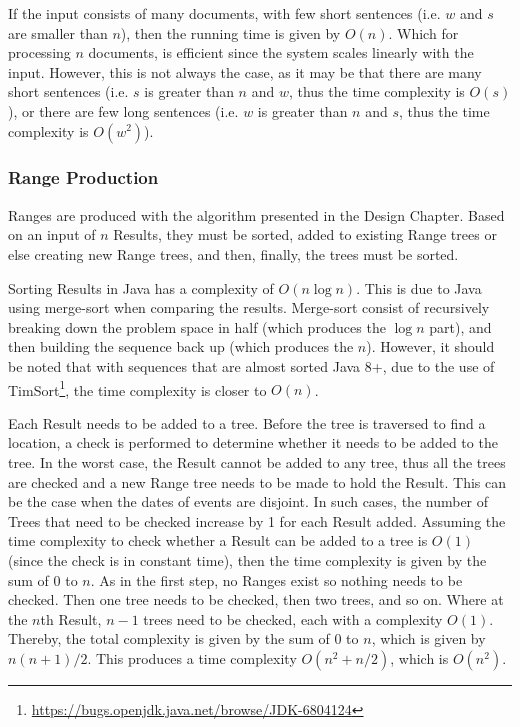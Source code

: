 \par If the input consists of many documents, with few short sentences (i.e. $w$ and $s$ are smaller than $n$), then the running time is given by $O(n)$. Which for processing $n$ documents, is efficient since the system scales linearly with the input. However, this is not always the case, as it may be that there are many short sentences (i.e. $s$ is greater than $n$ and $w$, thus the time complexity is $O(s)$), or there are few long sentences (i.e. $w$ is greater than $n$ and $s$, thus the time complexity is $O(w^2)$).

\subsubsection{Range Production}
\par Ranges are produced with the algorithm presented in the Design Chapter. Based on an input of $n$ Results, they must be sorted, added to existing Range trees or else creating new Range trees, and then, finally, the trees must be sorted.

\par Sorting Results in Java has a complexity of $O(n\log n)$. This is due to Java using merge-sort when comparing the results. Merge-sort consist of recursively breaking down the problem space in half (which produces the $\log n$ part), and then building the sequence back up (which produces the $n$). However, it should be noted that with sequences that are almost sorted Java 8+, due to the use of TimSort\footnote{\url{https://bugs.openjdk.java.net/browse/JDK-6804124}}, the time complexity is closer to $O(n)$. 

\par Each Result needs to be added to a tree. Before the tree is traversed to find a location, a check is performed to determine whether it needs to be added to the tree. In the worst case, the Result cannot be added to any tree, thus all the trees are checked and a new Range tree needs to be made to hold the Result. This can be the case when the dates of events are disjoint.  In such cases, the number of Trees that need to be checked increase by 1 for each Result added. Assuming the time complexity to check whether a Result can be added to a tree is $O(1)$ (since the check is in constant time), then the time complexity is given by the sum of 0 to $n$. As in the first step, no Ranges exist so nothing needs to be checked. Then one tree needs to be checked, then two trees, and so on. Where at the $n$th Result, $n-1$ trees need to be checked, each with a complexity $O(1)$. Thereby, the total complexity is given by the sum of 0 to $n$, which is given by ${n(n+1)}/2$. This produces a time complexity $O({n^2+n}/2)$, which is $O(n^2)$.

